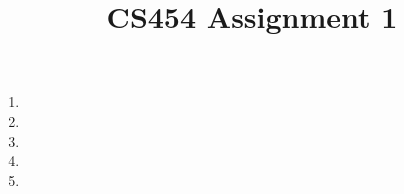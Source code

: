 \documentclass[12pt]{article}
\title{CS454 Assignment 1}
\begin{document}
\maketitle
\begin{enumerate}[{\bf Q1}]
\item
\item
\item
\item
\item
\end{enumerate}
\end{document}
